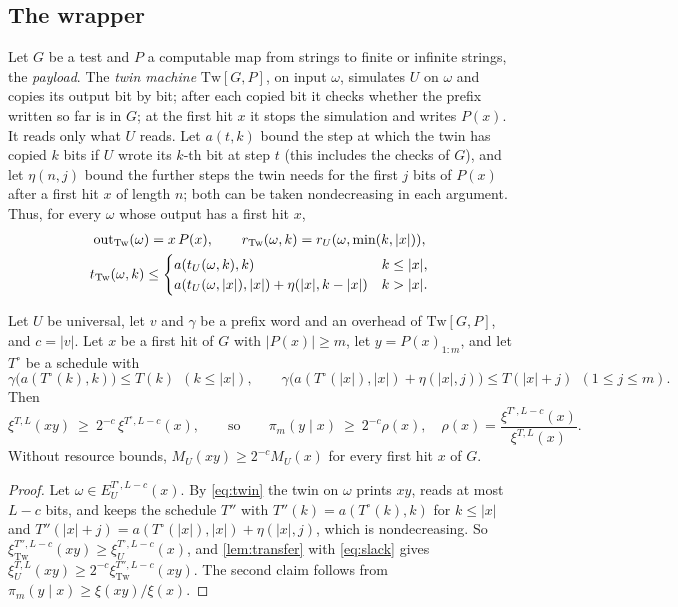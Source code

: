 \subsection{The wrapper}

Let $G$ be a test and $P$ a computable map from strings to finite or infinite strings, the \emph{payload}. The
\emph{twin machine} $\mathrm{Tw}[G,P]$, on input $\omega$, simulates $U$ on $\omega$ and copies its output bit by
bit; after each copied bit it checks whether the prefix written so far is in $G$; at the first hit $x$ it stops
the simulation and writes $P(x)$. It reads only what $U$ reads. Let $a(t,k)$ bound the step at which the twin
has copied $k$ bits if $U$ wrote its $k$-th bit at step $t$ (this includes the checks of $G$), and let
$\eta(n,j)$ bound the further steps the twin needs for the first $j$ bits of $P(x)$ after a first hit $x$ of
length $n$; both can be taken nondecreasing in each argument. Thus, for every $\omega$ whose output has a first
hit $x$,
\begin{equation}\label{eq:twin}
\begin{gathered}
\mathrm{out}_{\mathrm{Tw}}(\omega)=x\,P(x),\qquad r_{\mathrm{Tw}}(\omega,k)=r_U(\omega,\min(k,|x|)),\\
t_{\mathrm{Tw}}(\omega,k)\le\begin{cases}a(t_U(\omega,k),k)&k\le|x|,\\ a(t_U(\omega,|x|),|x|)+\eta(|x|,k-|x|)&k>|x|.\end{cases}
\end{gathered}
\end{equation}

\begin{theorem}[Floor]\label{thm:twin}
Let $U$ be universal, let $v$ and $\gamma$ be a prefix word and an overhead of $\mathrm{Tw}[G,P]$, and $c=|v|$.
Let $x$ be a first hit of $G$ with $|P(x)|\ge m$, let $y=P(x)_{1:m}$, and let $T^\circ$ be a schedule with
\begin{equation}\label{eq:slack}
\gamma\bigl(a(T^\circ(k),k)\bigr)\le T(k)\ \ (k\le|x|),\qquad
\gamma\bigl(a(T^\circ(|x|),|x|)+\eta(|x|,j)\bigr)\le T(|x|+j)\ \ (1\le j\le m).
\end{equation}
Then
\[
\xi^{T,L}(xy)\ \ge\ 2^{-c}\,\xi^{T^\circ,L-c}(x),\qquad\text{so}\qquad
\pi_m(y\mid x)\ \ge\ 2^{-c}\rho(x),\quad \rho(x)=\frac{\xi^{T^\circ,L-c}(x)}{\xi^{T,L}(x)} .
\]
Without resource bounds, $M_U(xy)\ge2^{-c}M_U(x)$ for every first hit $x$ of $G$.
\end{theorem}
\begin{proof}
Let $\omega\in E_U^{T^\circ,L-c}(x)$. By \eqref{eq:twin} the twin on $\omega$ prints $xy$, reads at most $L-c$
bits, and keeps the schedule $T''$ with $T''(k)=a(T^\circ(k),k)$ for $k\le|x|$ and
$T''(|x|+j)=a(T^\circ(|x|),|x|)+\eta(|x|,j)$, which is nondecreasing. So
$\xi_{\mathrm{Tw}}^{T'',L-c}(xy)\ge\xi_U^{T^\circ,L-c}(x)$, and
\cref{lem:transfer} with \eqref{eq:slack} gives $\xi_U^{T,L}(xy)\ge2^{-c}\xi_{\mathrm{Tw}}^{T'',L-c}(xy)$. The
second claim follows from $\pi_m(y\mid x)\ge\xi(xy)/\xi(x)$.
\end{proof}

